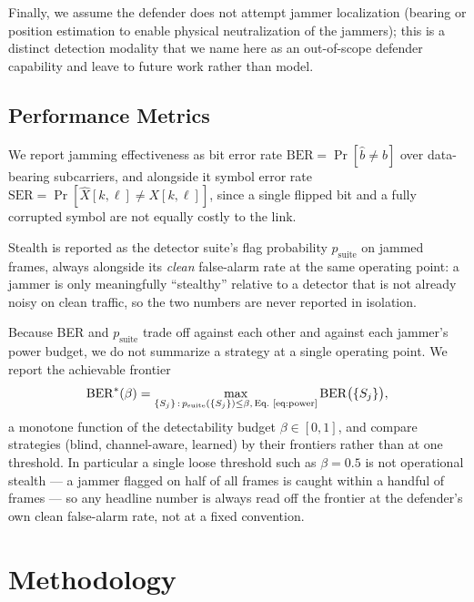 \documentclass[journal]{IEEEtran}
\newcommand{\rar}[1]{{\color{blue}{[#1]}}}
\begin{document}
Finally, we assume the defender does not attempt jammer localization
(bearing or position estimation to enable physical neutralization of the
jammers); this is a distinct detection modality that we name here as an
out-of-scope defender capability and leave to future work rather than model.

\subsection{Performance Metrics}
We report jamming effectiveness as bit error rate
$\mathrm{BER} = \Pr[\hat b \neq b]$ over data-bearing subcarriers, and
alongside it symbol error rate
$\mathrm{SER} = \Pr[\hat X[k,\ell] \neq X[k,\ell]]$, since a single flipped
bit and a fully corrupted symbol are not equally costly to the link.

Stealth is reported as the detector suite's flag probability
$p_{\mathrm{suite}}$ on jammed frames, always alongside its \emph{clean}
false-alarm rate at the same operating point: a jammer is only meaningfully
``stealthy'' relative to a detector that is not already noisy on clean
traffic, so the two numbers are never reported in isolation.

Because BER and $p_{\mathrm{suite}}$ trade off against each other and
against each jammer's power budget, we do not summarize a strategy at a
single operating point. We report the achievable frontier
\begin{equation}
\mathrm{BER}^*(\beta) = \max_{\{S_j\} \,:\, p_{\mathrm{suite}}(\{S_j\}) \le \beta,\, \text{Eq.~\eqref{eq:power}}} \mathrm{BER}\big(\{S_j\}\big),
\label{eq:frontier}
\end{equation}
a monotone function of the detectability budget $\beta \in [0,1]$, and
compare strategies (blind, channel-aware, learned) by their frontiers rather
than at one threshold. In particular a single loose threshold such as
$\beta=0.5$ is not operational stealth — a jammer flagged on half of all
frames is caught within a handful of frames — so any headline number is
always read off the frontier at the defender's own clean false-alarm rate,
not at a fixed convention.
\rar{Add adaptation-cost metrics here once the round-based protocol (R0/R1/R2)
has a section: $\Delta$accuracy, $\Delta$FAR, and training cost
(samples / GPU-hours) per retraining round, mirrored by the attacker's
re-optimization cost.}

\section{Methodology}
\rar{TODO}
\end{document}
